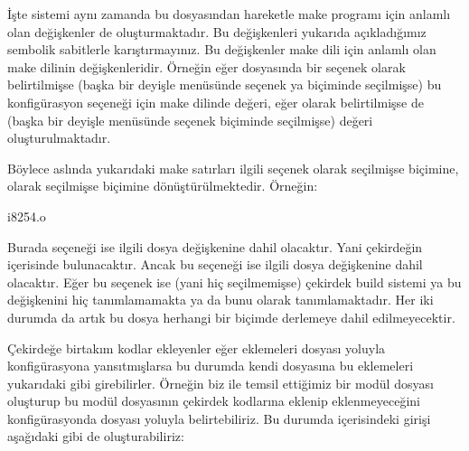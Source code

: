 \documentclass[a4paper,10pt,turkish]{sphinxmanual}
\begin{document}
\sphinxAtStartPar
İşte  sistemi aynı zamanda bu  dosyasından hareketle make programı için anlamlı
olan değişkenler de oluşturmaktadır. Bu değişkenleri yukarıda açıkladığımız sembolik sabitlerle
karıştırmayınız. Bu değişkenler make dili için anlamlı olan make dilinin değişkenleridir. Örneğin eğer
 dosyasında bir seçenek  olarak belirtilmişse (başka bir deyişle 
menüsünde seçenek \sphinxcode{\sphinxupquote{{[}*{]}}} ya \sphinxcode{\sphinxupquote{\textless{}*\textgreater{}}} biçiminde seçilmişse) bu konfigürasyon seçeneği için make dilinde
 değeri, eğer  olarak belirtilmişse de (başka bir deyişle  menüsünde
seçenek  biçiminde seçilmişse)  değeri oluşturulmaktadır.

\sphinxAtStartPar
Böylece aslında yukarıdaki make satırları ilgili seçenek  olarak seçilmişse  biçimine,
 olarak seçilmişse  biçimine dönüştürülmektedir. Örneğin:

\begin{sphinxVerbatim}[commandchars=\\\{\}]
i8254.o
\end{sphinxVerbatim}

\sphinxAtStartPar
Burada  seçeneği  ise ilgili dosya  değişkenine dahil olacaktır. Yani
çekirdeğin içerisinde bulunacaktır. Ancak bu  seçeneği  ise ilgili dosya 
değişkenine dahil olacaktır. Eğer bu seçenek  ise (yani hiç seçilmemişse) çekirdek build sistemi
ya bu  değişkenini hiç tanımlamamakta ya da bunu  olarak tanımlamaktadır. Her iki
durumda da artık bu dosya herhangi bir biçimde derlemeye dahil edilmeyecektir.

\sphinxAtStartPar
Çekirdeğe birtakım kodlar ekleyenler eğer eklemeleri  dosyası yoluyla konfigürasyona
yansıtmışlarsa bu durumda kendi  dosyasına bu eklemeleri yukarıdaki gibi girebilirler.
Örneğin biz  ile temsil ettiğimiz bir modül dosyası oluşturup bu modül dosyasının çekirdek
kodlarına eklenip eklenmeyeceğini konfigürasyonda  dosyası yoluyla belirtebiliriz. Bu durumda
 içerisindeki girişi aşağıdaki gibi de oluşturabiliriz:
\end{document}
